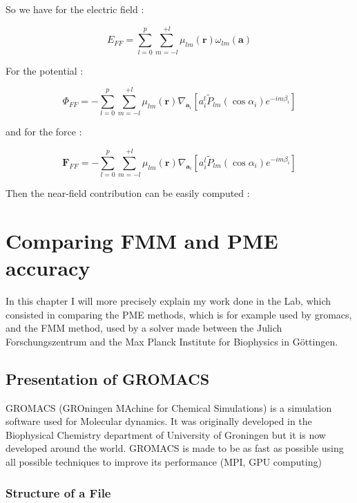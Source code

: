 \documentclass[12pt,twoside,a4paper]{report}
\begin{document}
   
   So we have for the electric field :
      
   \begin{equation}
   E_{FF} = \sum\limits_{l=0}^{p} \sum\limits_{m=-l}^{+l} \mu_{lm}(\textbf{r}) \omega_{lm}(\textbf{a})
   \end{equation}
   
   For the potential :
 
 	\begin{equation}
   \Phi_{FF} = - \sum\limits_{l=0}^{p} \sum\limits_{m=-l}^{+l} \mu_{lm}(\textbf{r}) \nabla_{\textbf{a}_i}[a_i^l \widetilde{P}_{lm}(\cos\alpha_i)e^{-im\beta_i}]
   \end{equation}
   
   and for the force :
   
   \begin{equation}
   \textbf{F}_{FF} = - \sum\limits_{l=0}^{p} \sum\limits_{m=-l}^{+l} \mu_{lm}(\textbf{r}) \nabla_{\textbf{a}_i}[a_i^l \widetilde{P}_{lm}(\cos\alpha_i)e^{-im\beta_i}]
   \end{equation}
   
 Then the near-field contribution can be easily computed : 

 

\chapter{Comparing FMM and PME accuracy}

    In this chapter I will more precisely explain my work done in the Lab, which consisted in comparing the PME methods, which is for example used by gromacs, and the FMM method, used by a solver made between the Julich Forschungszentrum and the Max Planck Institute for Biophysics in Göttingen.

  


\section{Presentation of GROMACS}

    GROMACS (GROningen MAchine for Chemical Simulations) is a simulation software used for Molecular dynamics. It was originally developed in the Biophysical Chemistry department of University of Groningen but it is now developed around the world. GROMACS is made to be as fast as possible using all possible techniques to improve its performance (MPI, GPU computing) 
    
   
	\subsection{Structure of a File}
	
\end{document}
